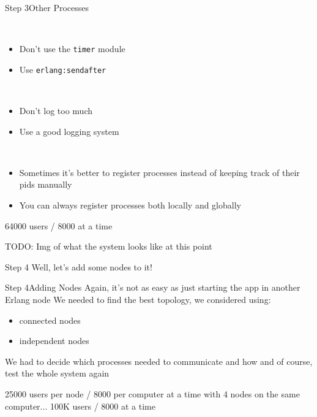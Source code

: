 \documentclass[utf8]{beamer}
\begin{document}
\begin{frame}{Step 3}{Other Processes}
	\begin{description}
		\item<+->[Timers]\ \\
			\begin{itemize}
				\item Don't use the \texttt{timer} module
				\item Use \texttt{erlang:send\textunderscore after}
			\end{itemize}
		\item<+->[Logging]\ \\
			\begin{itemize}
				\item Don't log too much
				\item Use a good logging system
			\end{itemize}
		\item<+->[Registration]\ \\
			\begin{itemize}
				\item Sometimes it's better to register processes instead of keeping track of their pids manually
				\item You can always register processes \alert{both} locally and globally
			\end{itemize}
	\end{description}
\end{frame}

\begin{frame}
64000 users / 8000 at a time
\end{frame}

\begin{frame}
TODO: Img of what the system looks like at this point
\end{frame}

\begin{frame}{Step 4}
Well, let's add some nodes to it!
\end{frame}

\begin{frame}{Step 4}{Adding Nodes}
Again, it's not as easy as just starting the app in another Erlang node
\pause
We needed to find the best topology, we considered using:
	\begin{itemize}
		\item connected nodes
		\item independent nodes
	\end{itemize}
\pause
We had to decide which processes needed to communicate and how
\pause
and of course, test the whole system again
\end{frame}

\begin{frame}
25000 users per node / 8000 per computer at a time
\pause
with 4 nodes on the same computer...
\pause
100K users / 8000 at a time
\end{frame}
\end{document}
